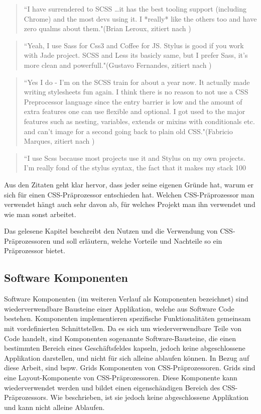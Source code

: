 \begin{quote}
``I have surrendered to SCSS …it has the best tooling support (including Chrome) and the most devs using it. I *really* like the others too and have zero qualms about them."(Brian Leroux, zitiert nach \cite[]{psdtowp.2014})
\end{quote} 
\begin{quote}
``Yeah, I use Sass for Css3 and Coffee for JS. Stylus is good if you work with Jade project. SCSS and Less its basicly same, but I prefer Sass, it's more clean and powerfull."(Gustavo Fernandes, zitiert nach \cite[]{psdtowp.2014})
\end{quote} 
\begin{quote}
``Yes I do - I’m on the SCSS train for about a year now. It actually made writing stylesheets fun again. I think there is no reason to not use a CSS Preprocessor language since the entry barrier is low and the amount of extra features one can use flexible and optional. I got used to the major features such as nesting, variables, extends or mixins with conditionals etc. and can’t image for a second going back to plain old CSS."(Fabricio Marques, zitiert nach \cite[]{psdtowp.2014})
\end{quote} 
\begin{quote}
``I use Scss because most projects use it and Stylus on my own projects. I'm really fond of the stylus syntax, the fact that it makes my stack 100%
\end{quote} 
Aus den Zitaten geht klar hervor, dass jeder seine eigenen Gründe hat, warum er sich für einen CSS-Präprozessor entschieden hat. \newline
Welchen CSS-Präprozessor man verwendet hängt auch sehr davon ab, für welches Projekt man ihn verwendet und wie man sonst arbeitet.\newline

Das gelesene Kapitel beschreibt den Nutzen und die Verwendung von CSS-Präprozessoren und soll erläutern, welche Vorteile und Nachteile so ein Präprozessor bietet.
\subsection{Software Komponenten}
Software Komponenten (im weiteren Verlauf als Komponenten bezeichnet) sind wiederverwendbare Bausteine einer Applikation, welche aus Software Code bestehen. Komponenten implementieren spezifische Funktionalitäten gemeinsam mit vordefinierten Schnittstellen. Da es sich um wiederverwendbare Teile von Code handelt, sind Komponenten sogenannte Software-Bausteine, die einen bestimmten Bereich eines Geschäftsfeldes kapseln, jedoch keine abgeschlossene Applikation darstellen, und nicht für sich alleine ablaufen können. \autocite[1]{Andresen.2003}\newline
In Bezug auf diese Arbeit, sind bspw. Grids Komponenten von CSS-Präprozessoren. Grids sind eine Layout-Komponente von CSS-Präprozessoren. Diese Komponente kann wiederverwendet werden und bildet einen eigenschändigen Bereich des CSS-Präprozessors. Wie beschrieben, ist sie jedoch keine abgeschlossene Applikation und kann nicht alleine Ablaufen.

